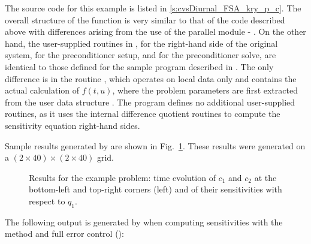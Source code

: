 The source code for this example is listed in \A\ref{s:cvsDiurnal_FSA_kry_p_c}.
The overall structure of the  function is very
similar to that of the code  described above with 
differences arising from the use of the parallel {\nvector} module - {\nvecp}.
On the other hand, the user-supplied routines in ,
 for the right-hand side of the original system,
 for the preconditioner setup, and  for the
preconditioner solve, are identical to those defined for the sample program
 described in \cite{cvode_ex}. The only difference is in the
routine , which operates on local data only and contains the actual 
calculation of $f(t,u)$, where the problem parameters are first extracted from
the user data structure . The program  defines no additional
user-supplied routines, as it uses the {\cvodes} internal difference quotient routines 
to compute the sensitivity equation right-hand sides.

Sample results generated by  are shown in Fig.~\ref{f:cvsDiurnal_FSA_kry_p}. 
These results were generated on a $(2\times40)\times(2\times40)$ grid.
\begin{figure}
  {\centerline{}}
  \caption{Results for the  example problem:
    time evolution of $c_1$ and $c_2$ at the bottom-left and top-right corners
    (left) and of their sensitivities with respect to $q_1$.}
  \label{f:cvsDiurnal_FSA_kry_p}
\end{figure}
The following output is generated by  when computing
sensitivities with the  method and full error
control ():

